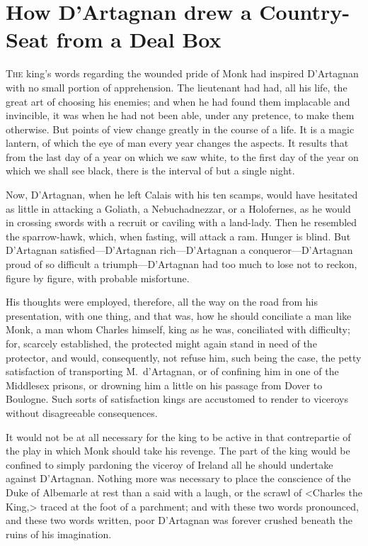 \chapter{How D'Artagnan drew a Country-Seat from a Deal Box}

\lettrine{T}{he} king's words regarding the wounded pride of Monk had inspired D'Artagnan with no small portion of apprehension. The lieutenant had had, all his life, the great art of choosing his enemies; and when he had found them implacable and invincible, it was when he had not been able, under any pretence, to make them otherwise. But points of view change greatly in the course of a life. It is a magic lantern, of which the eye of man every year changes the aspects. It results that from the last day of a year on which we saw white, to the first day of the year on which we shall see black, there is the interval of but a single night.

Now, D'Artagnan, when he left Calais with his ten scamps, would have hesitated as little in attacking a Goliath, a Nebuchadnezzar, or a Holofernes, as he would in crossing swords with a recruit or caviling with a land-lady. Then he resembled the sparrow-hawk, which, when fasting, will attack a ram. Hunger is blind. But D'Artagnan satisfied—D'Artagnan rich—D'Artagnan a conqueror—D'Artagnan proud of so difficult a triumph—D'Artagnan had too much to lose not to reckon, figure by figure, with probable misfortune.

His thoughts were employed, therefore, all the way on the road from his presentation, with one thing, and that was, how he should conciliate a man like Monk, a man whom Charles himself, king as he was, conciliated with difficulty; for, scarcely established, the protected might again stand in need of the protector, and would, consequently, not refuse him, such being the case, the petty satisfaction of transporting M.~d'Artagnan, or of confining him in one of the Middlesex prisons, or drowning him a little on his passage from Dover to Boulogne. Such sorts of satisfaction kings are accustomed to render to viceroys without disagreeable consequences.

It would not be at all necessary for the king to be active in that contrepartie of the play in which Monk should take his revenge. The part of the king would be confined to simply pardoning the viceroy of Ireland all he should undertake against D'Artagnan. Nothing more was necessary to place the conscience of the Duke of Albemarle at rest than a  said with a laugh, or the scrawl of <Charles the King,> traced at the foot of a parchment; and with these two words pronounced, and these two words written, poor D'Artagnan was forever crushed beneath the ruins of his imagination.

